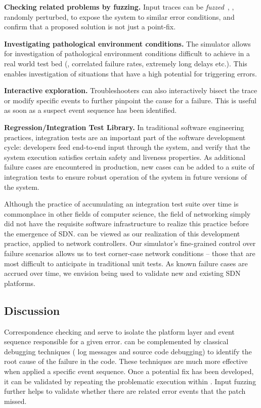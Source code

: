 \noindent\textbf{Checking related problems by fuzzing.} Input traces can be
\emph{fuzzed}~\cite{Miller:1990:ESR:96267.96279}, \ie{},
randomly perturbed, to expose the system to similar error conditions, and confirm
that a proposed solution is not just a point-fix.

\noindent\textbf{Investigating pathological environment conditions.} The simulator allows for investigation
of pathological environment conditions difficult to achieve in a real world test bed
(\eg{}, correlated failure rates, extremely long delays etc.). This enables
investigation of situations that have a high potential for triggering errors.

\noindent\textbf{Interactive exploration.} Troubleshooters can also interactively bisect
the trace or modify specific events to further pinpoint the cause for a failure.
This is useful as soon as a suspect event sequence has been identified.

\noindent\textbf{Regression/Integration Test Library.} In traditional software engineering practices,
integration tests are an
important part of the software development cycle: developers feed end-to-end
input through the system, and verify that the system execution satisfies
certain safety and liveness properties. As additional failure cases are encountered in
production, new cases can be added to a suite of integration tests to
ensure robust operation of the system in future versions of the system.

Although the practice of accumulating an integration test suite over time is
commonplace in other fields of computer science, the field of networking
simply did not have the requisite software infrastructure to realize this practice before the emergence
of SDN. \Simulator{} can be viewed as our realization
of this development practice, applied to network controllers. Our simulator's fine-grained control over
failure scenarios allows us to test corner-case network conditions -- those
that are most difficult to anticipate in traditional unit tests.
As known failure cases are accrued over time, we envision \simulator{} being used to validate
new and existing SDN platforms.

\subsection{Discussion}

Correspondence checking and \simulator{} serve to isolate the platform layer and
event sequence responsible for a given error. \projectname{} can be
complemented by classical debugging techniques (\eg{} log messages and source
code debugging) to identify the root cause of
the failure in the code. These techniques are much more
effective when applied a specific event sequence. Once a
potential fix has been developed, it can be validated by repeating the
problematic execution within \projectname{}. Input fuzzing further helps to
validate whether there are
related error events that the patch missed.
